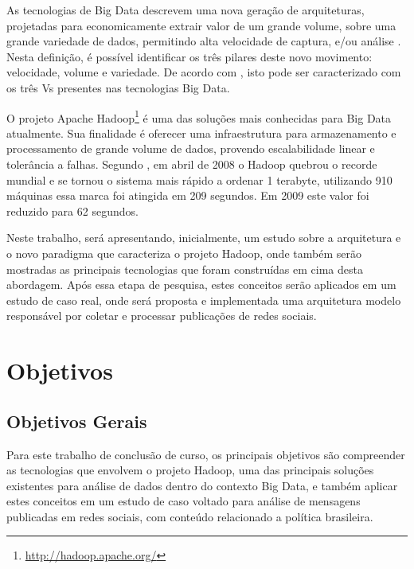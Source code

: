 As tecnologias de Big Data descrevem uma nova geração de arquiteturas, projetadas para economicamente extrair valor de um grande volume, sobre uma grande variedade de dados, permitindo alta velocidade de captura, e/ou análise \cite{gantz2011}. Nesta definição, é possível identificar os três pilares deste novo movimento: velocidade, volume e variedade. De acordo com , isto pode ser caracterizado com os três Vs presentes nas tecnologias Big Data.

O projeto Apache Hadoop\footnote{\url{http://hadoop.apache.org/}} é uma das soluções mais conhecidas para Big Data atualmente. Sua finalidade é oferecer uma infraestrutura para armazenamento e processamento de grande volume de dados, provendo escalabilidade linear e tolerância a falhas. Segundo , em abril de 2008 o Hadoop quebrou o recorde mundial e se tornou o sistema mais rápido a ordenar 1 terabyte, utilizando 910 máquinas essa marca foi atingida em 209 segundos. Em 2009 este valor foi reduzido para 62 segundos.

Neste trabalho, será apresentando, inicialmente, um estudo sobre a arquitetura e o novo paradigma que caracteriza o projeto Hadoop, onde também serão mostradas as principais tecnologias que foram construídas em cima desta abordagem. Após essa etapa de pesquisa, estes conceitos serão aplicados em um estudo de caso real, onde será proposta e implementada uma arquitetura modelo responsável por coletar e processar publicações de redes sociais.

 
\section{Objetivos}

\subsection{Objetivos Gerais}
 
Para este trabalho de conclusão de curso, os principais objetivos são compreender as tecnologias que envolvem o projeto Hadoop, uma das principais soluções existentes para análise de dados dentro do contexto Big Data, e também aplicar estes conceitos em um estudo de caso voltado para análise de mensagens publicadas em redes sociais, com conteúdo relacionado a política brasileira.
 
 
 
